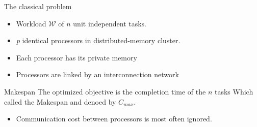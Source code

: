 \documentclass{beamer}
\begin{document}

\begin{frame}{The classical problem}
    \begin{itemize}
        \item { Workload $\mathcal{W}$ of $n$ unit independent tasks.}
        \item { \emph{p} identical processors in distributed-memory cluster.  }                                     
        \item { Each processor has its private memory}
        \item { Processors are linked by an interconnection network}                                     
    \end{itemize}
        
        \begin{block}{Makespan}
            The optimized objective is the completion time of the $n$ tasks Which called the \alert{Makespan} and denoed by \alert{$C_{max}$}.
        \end{block}
        
     \begin{itemize}
         \item \alert{ Communication cost between processors is most often ignored. }                                     
    \end{itemize}

\end{frame}
\end{document}
